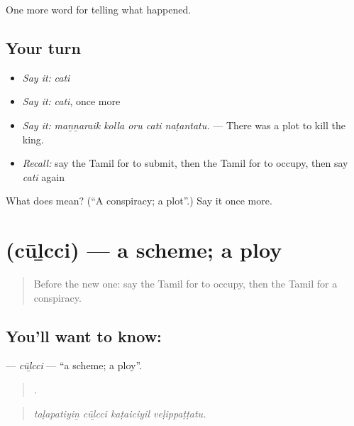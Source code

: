 \begin{grammarlens}[title={What you've built}]
One more word for telling what happened.
\end{grammarlens}

\subsection*{Your turn}
\begin{itemize}
\raggedright
  \item \emph{Say it:} \emph{cati}
  \item \emph{Say it:} \emph{cati}, once more
  \item \emph{Say it:} \emph{maṉṉaraik kolla oru cati naṭantatu.} — There was a plot to kill the king.
  \item \emph{Recall:} say the Tamil for to submit, then the Tamil for to occupy, then say \emph{cati} again
\end{itemize}

\begin{tcolorbox}[breakable,colback=teal!4,colframe=teal!35!black,title={Before you move on}]
What does  mean? (\textquotedblleft{}A conspiracy; a plot\textquotedblright{}.) Say it once more.
\end{tcolorbox}
\section[\texorpdfstring{\ta{சூழ்ச்சி} (cūḻcci)}{சூழ்ச்சி (cūḻcci)}]{ (cūḻcci) — a scheme; a ploy}

\label{lesson:TA-C337-culcci}



\begin{quote}
Before the new one: say the Tamil for to occupy, then the Tamil for a conspiracy.
\end{quote}

\subsection*{You'll want to know: }
\textbf{} — \emph{cūḻcci} — \textquotedblleft{}a scheme; a ploy\textquotedblright{}.

\begin{quote}
   .
\end{quote}

\begin{quote}
\emph{taḷapatiyiṉ cūḻcci kaṭaiciyil veḷippaṭṭatu.}
\end{quote}

